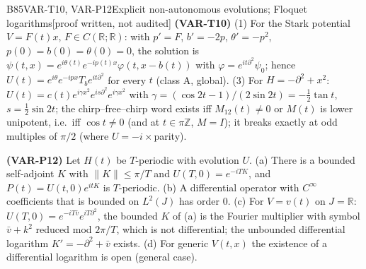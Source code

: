 \documentclass[11pt,a4paper,oneside]{report}
\newcommand{\badge}[2]{\textcolor{#1}{\textsf{\footnotesize[#2]}}}
\newcommand{\pw}{\badge{cD}{proof written, not audited}}
\newcommand{\R}{\mathbb{R}}\newcommand{\C}{\mathbb{C}}\newcommand{\N}{\mathbb{N}}\newcommand{\Z}{\mathbb{Z}}\newcommand{\Q}{\mathbb{Q}}
\newenvironment{dimcard}[5]{\par\Needspace{12\baselineskip}\begin{dimcardbox}{#1}{#2}{#3}{#4}{#5}}{\end{dimcardbox}}
\begin{document}
\begin{dimcard}{B85}{VAR-T10, VAR-P12}{Explicit non-autonomous evolutions; Floquet logarithms}{\pw}{}
\textbf{(VAR-T10)} (1) For the Stark potential $V=F(t)x$, $F\in C(\R;\R)$: with $p'=F$, $b'=-2p$, $\theta'=-p^2$, $p(0)=b(0)=\theta(0)=0$, the solution is $\psi(t,x)=e^{i\theta(t)}e^{-ip(t)x}\varphi(t,x-b(t))$ with $\varphi=e^{it\partial^2}\psi_0$; hence $U(t)=e^{i\theta}e^{-ipx}T_be^{it\partial^2}$ for every $t$ (class A, global). (3) For $H=-\partial^2+x^2$: $U(t)=c(t)e^{i\gamma x^2}e^{is\partial^2}e^{i\gamma x^2}$ with $\gamma=(\cos2t-1)/(2\sin2t)=-\tfrac12\tan t$, $s=\tfrac12\sin2t$; the chirp--free--chirp word exists iff $M_{12}(t)\ne0$ or $M(t)$ is lower unipotent, i.e.\ iff $\cos t\ne0$ (and at $t\in\pi\Z$, $M=I$); it breaks exactly at odd multiples of $\pi/2$ (where $U=-i\times$parity).

\textbf{(VAR-P12)} Let $H(t)$ be $T$-periodic with evolution $U$. (a) There is a bounded self-adjoint $K$ with $\|K\|\le\pi/T$ and $U(T,0)=e^{-iTK}$, and $P(t)=U(t,0)e^{itK}$ is $T$-periodic. (b) A differential operator with $C^\infty$ coefficients that is bounded on $L^2(J)$ has order $0$. (c) For $V=v(t)$ on $J=\R$: $U(T,0)=e^{-iT\bar v}e^{iT\partial^2}$, the bounded $K$ of (a) is the Fourier multiplier with symbol $\bar v+k^2$ reduced mod $2\pi/T$, which is not differential; the unbounded differential logarithm $K'=-\partial^2+\bar v$ exists. (d) For generic $V(t,x)$ the existence of a differential logarithm is open (general case).
\end{dimcard}
\end{document}
